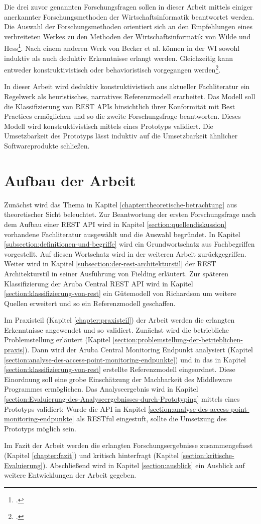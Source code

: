 Die drei zuvor genannten Forschungsfragen sollen in dieser Arbeit mittels einiger anerkannter Forschungsmethoden der Wirtschaftsinformatik beantwortet werden. Die Auswahl der Forschungsmethoden orientiert sich an den Empfehlungen eines verbreiteten Werkes zu den Methoden der Wirtschaftsinformatik von Wilde und Hess\footcite[Vgl. ]{wilde_methodenspektrum_2006}. Nach einem anderen Werk von Becker et al. können in der WI sowohl induktiv als auch deduktiv Erkenntnisse erlangt werden. Gleichzeitig kann entweder konstruktivistisch oder behavioristisch vorgegangen werden\footcite[][]{}.

In dieser Arbeit wird deduktiv konstruktivistisch aus aktueller Fachliteratur ein Regelwerk als heuristisches, narratives Referenzmodell erarbeitet. Das Modell soll die Klassifizierung von REST APIs hinsichtlich ihrer Konformität mit Best Practices ermöglichen und so die zweite Forschungsfrage beantworten. Dieses Modell wird konstruktivistisch mittels eines Prototyps validiert. Die Umsetzbarkeit des Prototyps lässt induktiv auf die Umsetzbarkeit ähnlicher Softwareprodukte schließen.
 
\section{Aufbau der Arbeit}\label{section:aufbau-der-arbeit}

Zunächst wird das Thema in Kapitel \ref{chapter:theoretische-betrachtung} aus theoretischer Sicht beleuchtet. Zur Beantwortung der ersten Forschungsfrage nach dem Aufbau einer REST API wird in Kapitel \ref{section:quellendiskussion} vorhandene Fachliteratur ausgewählt und die Auswahl begründet. In Kapitel \ref{subsection:definitionen-und-begriffe} wird ein Grundwortschatz aus Fachbegriffen vorgestellt. Auf diesen Wortschatz wird in der weiteren Arbeit zurückgegriffen. Weiter wird in Kapitel \ref{subsection:der-rest-architekturstil} der REST Architekturstil in seiner Ausführung von Fielding erläutert. Zur späteren Klassifizierung der Aruba Central REST API wird in Kapitel \ref{section:klassifizierung-von-rest} ein Gütemodell von Richardson um weitere Quellen erweitert und so ein Referenzmodell geschaffen.

Im Praxisteil (Kapitel \ref{chapter:praxisteil}) der Arbeit werden die erlangten Erkenntnisse angewendet und so validiert. Zunächst wird die betriebliche Problemstellung erläutert (Kapitel \ref{section:problemstellung-der-betrieblichen-praxis}). Dann wird der Aruba Central Monitoring Endpunkt analysiert (Kapitel \ref{section:analyse-des-access-point-monitoring-endpunkte}) und in das in Kapitel \ref{section:klassifizierung-von-rest} erstellte Referenzmodell eingeordnet. Diese Einordnung soll eine grobe Einschätzung der Machbarkeit des Middleware Programmes ermöglichen. Das Analyseergebnis wird in Kapitel \ref{section:Evaluierung-des-Analyseergebnisses-durch-Prototyping} mittels eines Prototyps validiert: Wurde die API in Kapitel \ref{section:analyse-des-access-point-monitoring-endpunkte} als RESTful eingestuft, sollte die Umsetzung des Prototyps möglich sein.

Im Fazit der Arbeit werden die erlangten Forschungsergebnisse zusammengefasst (Kapitel \ref{chapter:fazit}) und kritisch hinterfragt (Kapitel \ref{section:kritische-Evaluierung}). Abschließend wird in Kapitel \ref{section:ausblick} ein Ausblick auf weitere Entwicklungen der Arbeit gegeben.




